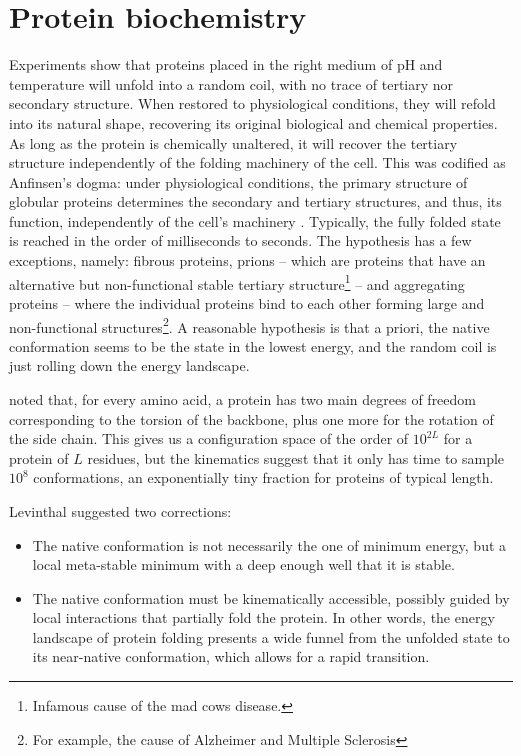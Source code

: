 \section{Protein biochemistry}

Experiments show that proteins placed in the right medium of pH and temperature will unfold into a random coil, with no trace of tertiary nor secondary structure.
When restored to physiological conditions, they will refold into its natural shape, recovering its original biological and chemical properties.
As long as the protein is chemically unaltered, it will recover the tertiary structure independently of the folding machinery of the cell.
This was codified as Anfinsen's dogma: under physiological conditions, the primary structure of globular proteins determines the secondary and tertiary structures, and thus, its function, independently of the cell's machinery \citep{Anfinsen_dogma}.
Typically, the fully folded state is reached in the order of milliseconds to seconds.
The hypothesis has a few exceptions, namely: fibrous proteins, prions -- which are proteins that have an alternative but non-functional stable tertiary structure\footnote{Infamous cause of the mad cows disease.} -- and aggregating proteins -- where the individual proteins bind to each other forming large and non-functional structures\footnote{For example, the cause of Alzheimer and Multiple Sclerosis}.
A reasonable hypothesis is that a priori, the native conformation seems to be the state in the lowest energy, and the random coil is just rolling down the energy landscape.

\citet{fold_graciously}  noted that, for every amino acid, a protein has two main degrees of freedom corresponding to the torsion of the backbone, plus one more for the rotation of the side chain.
This gives us a configuration space of the order of $10^{2L}$ for a protein of $L$ residues, but the kinematics suggest that it only has time to sample $10^8$ conformations, an exponentially tiny fraction for proteins of typical length.

Levinthal suggested two corrections:
\begin{itemize}
	\item The native conformation is not necessarily the one of minimum energy, but a local meta-stable minimum with a deep enough well that it is stable.
	\item The native conformation must be kinematically accessible, possibly guided by local interactions that partially fold the protein.
	In other words, the energy landscape of protein folding presents a wide funnel from the unfolded state to its near-native conformation, which allows for a rapid transition.
\end{itemize}

